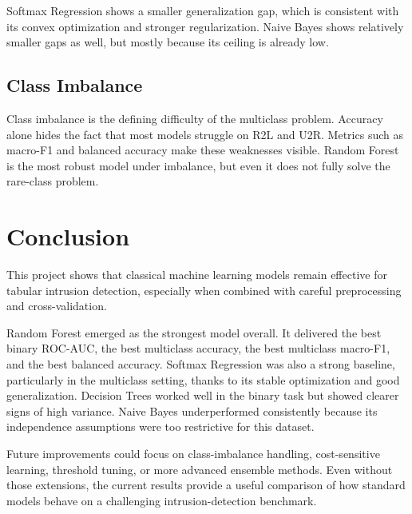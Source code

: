 \documentclass[12pt,a4paper]{article}
\begin{document}
Softmax Regression shows a smaller generalization gap, which is consistent with its convex optimization and stronger regularization. Naive Bayes shows relatively smaller gaps as well, but mostly because its ceiling is already low.

\subsection{Class Imbalance}

Class imbalance is the defining difficulty of the multiclass problem. Accuracy alone hides the fact that most models struggle on R2L and U2R. Metrics such as macro-F1 and balanced accuracy make these weaknesses visible. Random Forest is the most robust model under imbalance, but even it does not fully solve the rare-class problem.

\section{Conclusion}

This project shows that classical machine learning models remain effective for tabular intrusion detection, especially when combined with careful preprocessing and cross-validation.

Random Forest emerged as the strongest model overall. It delivered the best binary ROC-AUC, the best multiclass accuracy, the best multiclass macro-F1, and the best balanced accuracy. Softmax Regression was also a strong baseline, particularly in the multiclass setting, thanks to its stable optimization and good generalization. Decision Trees worked well in the binary task but showed clearer signs of high variance. Naive Bayes underperformed consistently because its independence assumptions were too restrictive for this dataset.

Future improvements could focus on class-imbalance handling, cost-sensitive learning, threshold tuning, or more advanced ensemble methods. Even without those extensions, the current results provide a useful comparison of how standard models behave on a challenging intrusion-detection benchmark.
\end{document}
